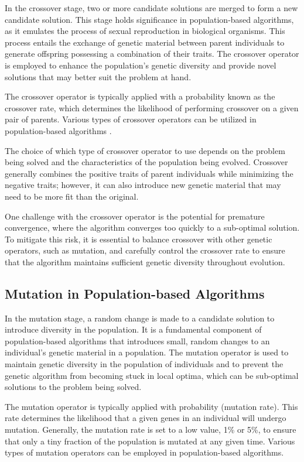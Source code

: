 \documentclass[runningheads]{llncs}
\begin{document}
In the crossover stage, two or more candidate solutions are merged to form a new candidate solution. This stage holds significance in population-based algorithms, as it emulates the process of sexual reproduction in biological organisms. This process entails the exchange of genetic material between parent individuals to generate offspring possessing a combination of their traits. The crossover operator is employed to enhance the population's genetic diversity and provide novel solutions that may better suit the problem at hand.

The crossover operator is typically applied with a probability known as the crossover rate, which determines the likelihood of performing crossover on a given pair of parents. Various types of crossover operators can be utilized in population-based algorithms \cite{Umbarkar-2015}.

The choice of which type of crossover operator to use depends on the problem being solved and the characteristics of the population being evolved. Crossover generally combines the positive traits of parent individuals while minimizing the negative traits; however, it can also introduce new genetic material that may need to be more fit than the original.

One challenge with the crossover operator is the potential for premature convergence, where the algorithm converges too quickly to a sub-optimal solution. To mitigate this risk, it is essential to balance crossover with other genetic operators, such as mutation, and carefully control the crossover rate to ensure that the algorithm maintains sufficient genetic diversity throughout evolution.

\subsection{Mutation in Population-based Algorithms}

In the mutation stage, a random change is made to a candidate solution to introduce diversity in the population. It is a fundamental component of population-based algorithms that introduces small, random changes to an individual's genetic material in a population. The mutation operator is used to maintain genetic diversity in the population of individuals and to prevent the genetic algorithm from becoming stuck in local optima, which can be sub-optimal solutions to the problem being solved.

The mutation operator is typically applied with probability (mutation rate)\cite{Greenwell-1995}. This rate determines the likelihood that a given genes in an individual will undergo mutation. Generally, the mutation rate is set to a low value, 1\% or 5\%, to ensure that only a tiny fraction of the population is mutated at any given time. Various types of mutation operators can be employed in population-based algorithms.
\end{document}
